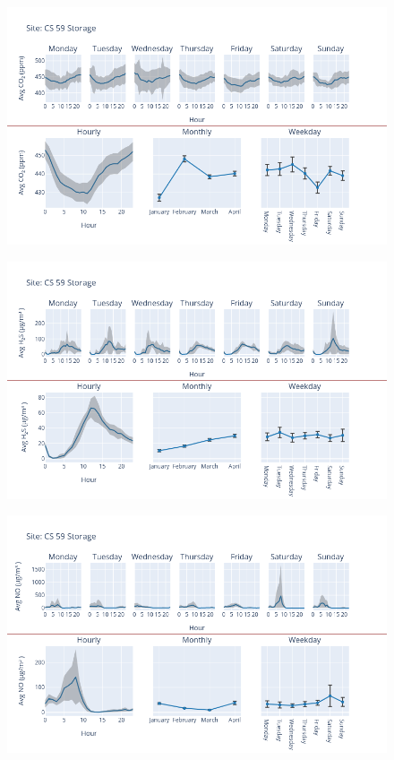 \documentclass[12pt, oneside]{book}
\begin{document}
{ 
{\begin{figure}[H] 
 \centering 
\includegraphics[width=.88\textwidth, keepaspectratio]{image68} 
 \end{figure}}{} 

{\begin{figure}[H] 
 \centering 
\includegraphics[width=.88\textwidth, keepaspectratio]{image69} 
 \end{figure}}{} 

{\begin{figure}[H] 
 \centering 
\includegraphics[width=.88\textwidth, keepaspectratio]{image70} 
 \end{figure}}{} 

}
\end{document}
